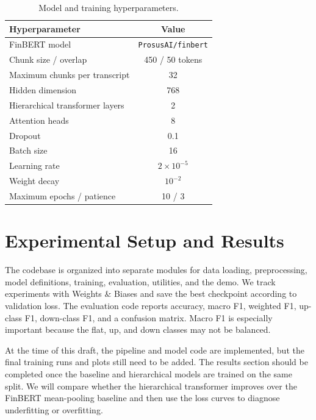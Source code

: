 \documentclass[11pt]{article}
\begin{document}
\begin{table}[H]
\centering
\begin{tabular}{lc}
\toprule
Hyperparameter & Value \\
\midrule
FinBERT model & \texttt{ProsusAI/finbert} \\
Chunk size / overlap & 450 / 50 tokens \\
Maximum chunks per transcript & 32 \\
Hidden dimension & 768 \\
Hierarchical transformer layers & 2 \\
Attention heads & 8 \\
Dropout & 0.1 \\
Batch size & 16 \\
Learning rate & $2\times 10^{-5}$ \\
Weight decay & $10^{-2}$ \\
Maximum epochs / patience & 10 / 3 \\
\bottomrule
\end{tabular}
\caption{Model and training hyperparameters.}
\label{tab:hyperparameters}
\end{table}

\section{Experimental Setup and Results}

The codebase is organized into separate modules for data loading, preprocessing, model definitions, training, evaluation, utilities, and the demo. We track experiments with Weights \& Biases and save the best checkpoint according to validation loss. The evaluation code reports accuracy, macro F1, weighted F1, up-class F1, down-class F1, and a confusion matrix. Macro F1 is especially important because the flat, up, and down classes may not be balanced.

At the time of this draft, the pipeline and model code are implemented, but the final training runs and plots still need to be added. The results section should be completed once the baseline and hierarchical models are trained on the same split. We will compare whether the hierarchical transformer improves over the FinBERT mean-pooling baseline and then use the loss curves to diagnose underfitting or overfitting.
\end{document}
